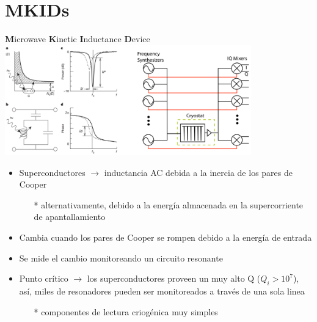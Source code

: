 \documentclass[ignorenonframetext,12pt]{beamer}
\begin{document}
\section{MKIDs}
\begin{frame}{\textbf{M}icrowave \textbf{K}inetic \textbf{I}nductance \textbf{D}evice}
												\centering
												\includegraphics[width=0.8\textwidth]{concepto_mkid1}
				\begin{itemize}
								\item \footnotesize{Superconductores $\to$ inductancia AC debida a la
												inercia de los pares de Cooper}
												\begin{itemize}
																\item[*] \scriptsize{{\color{blue}alternativamente, debido a la
																				energía almacenada en la supercorriente
																				de apantallamiento}}
												\end{itemize}
								\item Cambia cuando los pares de Cooper se rompen debido a la
												energía de entrada
								\item Se mide el cambio monitoreando un circuito resonante
								\item Punto crítico $\to$ los superconductores proveen un muy
												alto Q ($Q_i > 10^7$), así, miles de resonadores
												pueden ser monitoreados a través de una sola linea 
												\begin{itemize}
																\item[*] \scriptsize{{\color{blue}componentes de lectura criogénica muy
																				simples}}
												\end{itemize}
				\end{itemize}

\end{frame}
\end{document}
